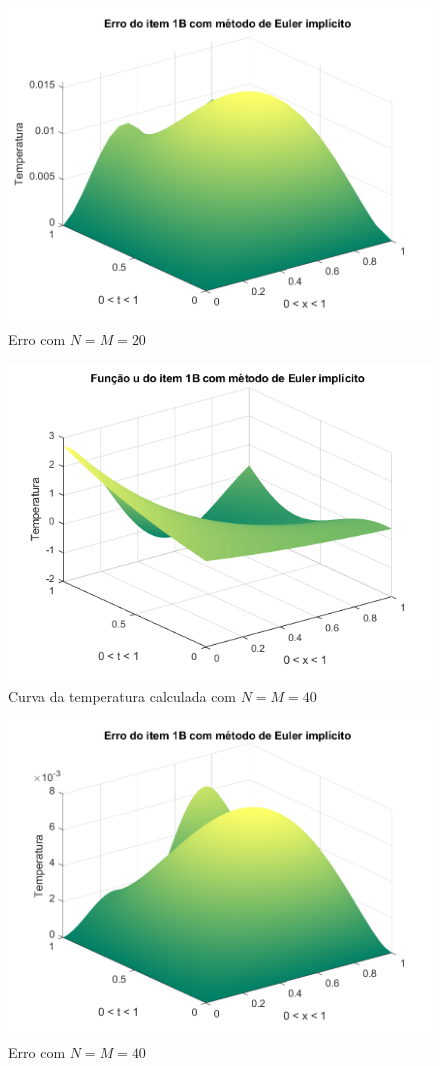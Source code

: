 \documentclass[12pt]{article}
\begin{document}
\begin{spacing}{1.5}
\begin{figure}
    \centering
    \includegraphics[width=0.8\linewidth]{Segunda_Tarefa/ItemB/nm20_erro_B.png}
    \caption{Erro com $N=M=20$}
    \label{fig:BB_nm20_erro}
\end{figure}

\begin{figure}
    \centering
    \includegraphics[width=0.8\linewidth]{Segunda_Tarefa/ItemB/nm40_calculada_B.png}
    \caption{Curva da temperatura calculada com $N=M=40$}
    \label{fig:BB_nm40_calculada}
\end{figure}

\begin{figure}
    \centering
    \includegraphics[width=0.8\linewidth]{Segunda_Tarefa/ItemB/nm40_erro_B.png}
    \caption{Erro com $N=M=40$}
    \label{fig:BB_nm40_erro}
\end{figure}


\end{spacing}
\end{document}
